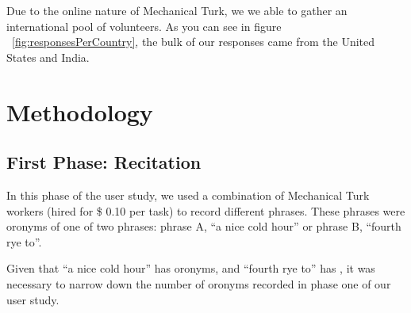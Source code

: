 Due to the online nature of Mechanical Turk, we we able to gather an international pool of volunteers. As you can see in figure ~\ref{fig:responsesPerCountry}, the bulk of our responses came from the United States and India.


\section{Methodology}

\subsection{First Phase: Recitation}
\label{subsection:firstWaveUserStudy}
In this phase of the user study, we used a combination of \uniqueUsersPhaseOneUserStudy Mechanical Turk workers (hired for \$ 0.10 per task) to record \numResponsesPhaseOneUserStudy different phrases.  These phrases were oronyms of one of two phrases: phrase A, ``a nice cold hour'' or phrase B, ``fourth rye to''.  

Given that ``a nice cold hour'' has \aNiceColdHourOronymCount oronyms, and ``fourth rye to'' has \forthRyeToOronymCount, it was necessary to narrow down the number of oronyms recorded in phase one of our user study.  

